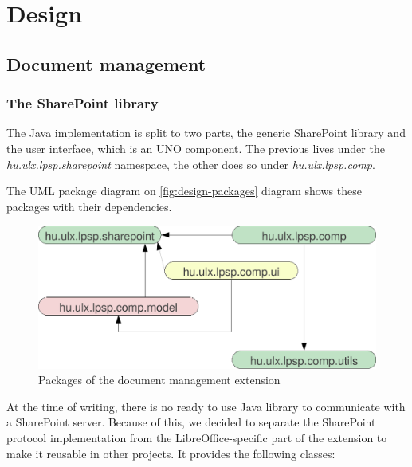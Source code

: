 \chapter{Design}

\section{Document management}

\subsection{The SharePoint library}

The Java implementation is split to two parts, the generic SharePoint library
and the user interface, which is an UNO component. The previous lives under the
\emph{hu.ulx.lpsp.sharepoint} namespace, the other does so under
\emph{hu.ulx.lpsp.comp}.

The UML package diagram on \autoref{fig:design-packages} diagram shows these
packages with their dependencies.

\begin{figure}[H]
\centering
\includegraphics[width=425px,keepaspectratio]{design-packages.pdf}
\caption{Packages of the document management extension}
\label{fig:design-packages}
\end{figure}

At the time of writing, there is no ready to use Java library to communicate
with a SharePoint server. Because of this, we decided to separate the SharePoint
protocol implementation from the LibreOffice-specific part of the extension to
make it reusable in other projects. It provides the following classes:

